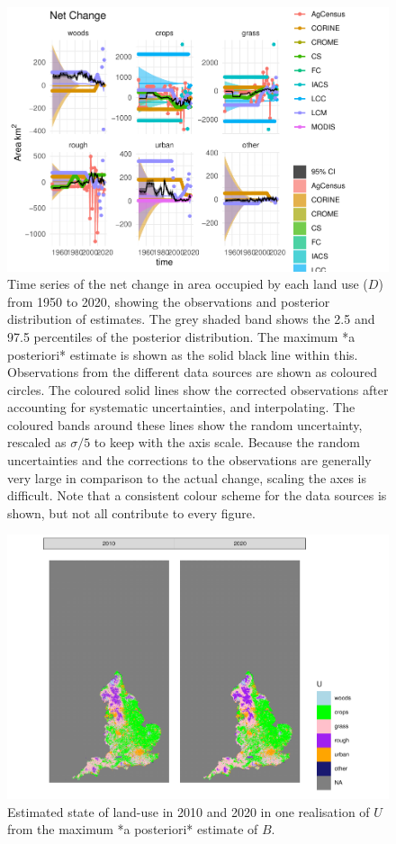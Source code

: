 \documentclass[
]{book}
\begin{document}
\begin{figure}
\includegraphics[width=1.3\linewidth]{Results_en_files/figure-latex/plotD-1} \caption{ Time series of the net change in area occupied by each land use ($D$) from 1950 to 2020, showing the observations and posterior distribution of estimates. The grey shaded band shows the 2.5 and 97.5 percentiles of the posterior distribution. The maximum *a posteriori* estimate is shown as the solid black line within this. Observations from the different data sources are shown as coloured circles. The coloured solid lines show the corrected observations after accounting for systematic uncertainties, and interpolating. The coloured bands around these lines show the random uncertainty, rescaled as $\sigma /5$ to keep with the axis scale. Because the random uncertainties and the corrections to the observations are generally very large in comparison to the actual change, scaling the axes is difficult. Note that a consistent colour scheme for the data sources is shown, but not all contribute to every figure.}\label{fig:plotD}
\end{figure}

\begin{figure}
\includegraphics[width=1.3\linewidth]{Results_en_files/figure-latex/plotUt-1} \caption{Estimated state of land-use in 2010 and 2020 in one realisation of $U$ from the maximum *a posteriori* estimate of $B$.}\label{fig:plotUt}
\end{figure}
\end{document}
